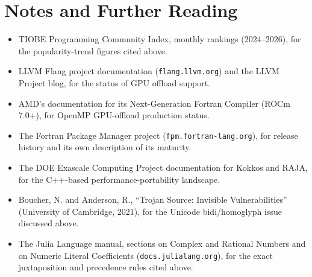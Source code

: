 \section*{Notes and Further Reading}
\begin{itemize}[leftmargin=1.5em]
  \item TIOBE Programming Community Index, monthly rankings (2024--2026), for the popularity-trend figures cited above.
  \item LLVM Flang project documentation (\texttt{flang.llvm.org}) and the LLVM Project blog, for the status of GPU offload support.
  \item AMD's documentation for its Next-Generation Fortran Compiler (ROCm 7.0+), for OpenMP GPU-offload production status.
  \item The Fortran Package Manager project (\texttt{fpm.fortran-lang.org}), for release history and its own description of its maturity.
  \item The DOE Exascale Computing Project documentation for Kokkos and RAJA, for the C++-based performance-portability landscape.
  \item Boucher, N. and Anderson, R., ``Trojan Source: Invisible Vulnerabilities'' (University of Cambridge, 2021), for the Unicode bidi/homoglyph issue discussed above.
  \item The Julia Language manual, sections on Complex and Rational Numbers and on Numeric Literal Coefficients (\texttt{docs.julialang.org}), for the exact juxtaposition and precedence rules cited above.
\end{itemize}


